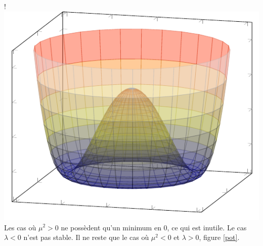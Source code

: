 {{}
\resizebox {\marginparwidth} {!} 
{
	\includegraphics[scale=1]{SM/mp.pdf}
}
\label{profile}
}
Les cas où $\mu^{2}>0$ ne possèdent qu'un minimum en $0$, ce qui est inutile. Le cas $\lambda<0$ n'est pas stable. Il ne reste que le cas où $\mu^{2}<0$ et $\lambda>0$, figure \ref{pot}.


